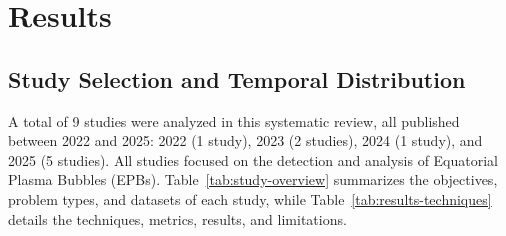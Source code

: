 \section{Results}\label{sec:results}

\subsection{Study Selection and Temporal Distribution}\label{subsec:study-selection-temporal-distribution}

A total of 9 studies were analyzed in this systematic review, all published between 2022 and 2025: 2022 (1 study), 2023 (2 studies), 2024 (1 study), and 2025 (5 studies). All studies focused on the detection and analysis of Equatorial Plasma Bubbles (EPBs). Table~\ref{tab:study-overview} summarizes the objectives, problem types, and datasets of each study, while Table~\ref{tab:results-techniques} details the techniques, metrics, results, and limitations.


